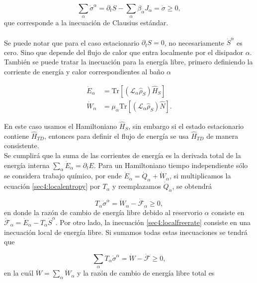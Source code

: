 \begin{equation*}
    \sum_{\alpha}\dot{\sigma}^{\alpha} = \partial_{t}S - \sum_{\alpha}\beta_{\alpha}J_{\alpha} = \dot{\sigma} \geq 0,
\end{equation*}
que corresponde a la inecuación de Clausius estándar.\\
\\
Se puede notar que para el caso estacionario $\partial_{t}S = 0$, no necesariamente $\dot{S}^{\alpha}$ es cero. Sino que depende del flujo de calor que entra localmente por el disipador $\alpha$. También se puede tratar la inecuación para la energía libre, primero definiendo la corriente de energía y calor correspondientes al baño $\alpha$

\begin{align*}
    \dot{E}_{\alpha} & = \text{Tr}[ (\mathcal{L}_{\alpha} \hat{\rho}_{S}) \hat{H}_{S}] \\
    \dot{W}_{\alpha} & = \mu_{\alpha}\text{Tr}[ (\mathcal{L}_{\alpha} \hat{\rho}_{S}) \hat{N}].
\end{align*}

En este caso usamos el Hamiltoniano $\hat{H}_{S}$, sin embargo si el estado estacionario contiene $\hat{H}_{TD}$, entonces para definir el flujo de energía se usa $\hat{H}_{TD}$ de manera consistente.\\
 Se cumplirá que la suma de las corrientes de energía es la derivada total de la energía interna $\sum_{\alpha} \dot{E}_{\alpha} = \partial_{t}E$. Para un Hamiltoniano tiempo independiente sólo se considera trabajo químico, por ende $\dot{E}_{\alpha} = \dot{Q}_{\alpha} + \dot{W}_{\alpha}$, si multiplicamos la ecuación \ref{sec4:localentropy} por $T_{\alpha}$ y reemplazamos $\dot{Q}_{\alpha}$, se obtendrá

\begin{equation}
    T_{\alpha} \dot{\sigma}^{\alpha} = \dot{W}_{\alpha} - \dot{\mathcal{F}}_{\alpha} \geq 0,
\label{sec4:localfreerate}
\end{equation}
en donde la razón de cambio de energía libre debido al reservorio $\alpha$ consiste en $\dot{\mathcal{F}}_{\alpha} = \dot{E}_{\alpha} - T_{\alpha}\dot{S}^{\alpha}$. Por otro lado, la inecuación \ref{sec4:localfreerate} consiste en una inecuación local de energía libre. Si sumamos todas estas inecuaciones se tendrá que

\begin{equation}
    \sum_{\alpha}T_{\alpha} \dot{\sigma}^{\alpha} = \dot{W} - \dot{\mathcal{F}} \geq 0,
\label{sec4:freeratefinal}
\end{equation}
en la cuál $\dot{W} = \sum_{\alpha}\dot{W}_{\alpha}$ y la razón de cambio de energía libre total es

